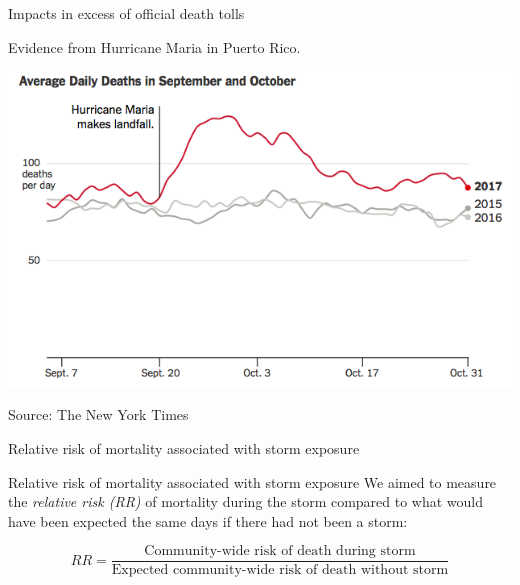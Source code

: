 \documentclass[ignorenonframetext,]{beamer}
\begin{document}
\begin{frame}{Impacts in excess of official death tolls}

Evidence from Hurricane Maria in Puerto Rico.

\includegraphics[width=\textwidth]{figures/maria_timeseries}

\footnotesize Source: The New York Times

\end{frame}

\begin{frame}{Relative risk of mortality associated with storm exposure}

\begin{block}{Relative risk of mortality associated with storm exposure}
We aimed to measure the \textit{relative risk (RR)} of mortality during the storm compared to what would have been expected the same days if there had not been a storm:

\begin{equation*}
RR = \frac{\text{Community-wide risk of death during storm}}{\text{Expected community-wide risk of death without storm}}
\end{equation*}

\end{block}

\end{frame}
\end{document}
